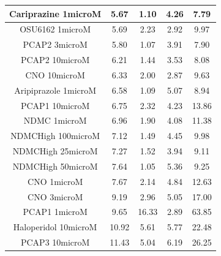 \documentclass[a4paper,12pt]{article}
\begin{document}
\begin{table}[h!]
\begin{tabular}{|c|c|c|c|c|}
Cariprazine 1microM   & 5.67  & 1.10   & 4.26 & 7.79  \\ \hline
OSU6162 1microM       & 5.69  & 2.23  & 2.92 & 9.97  \\ \hline
PCAP2 3microM         & 5.80   & 1.07  & 3.91 & 7.90   \\ \hline
PCAP2 10microM        & 6.21  & 1.44  & 3.53 & 8.08  \\ \hline
CNO 10microM          & 6.33  & 2.00     & 2.87 & 9.63  \\ \hline
Aripiprazole 1microM  & 6.58  & 1.09  & 5.07 & 8.94  \\ \hline
PCAP1 10microM        & 6.75  & 2.32  & 4.23 & 13.86 \\ \hline
NDMC 1microM          & 6.96  & 1.90   & 4.08 & 11.38 \\ \hline
NDMCHigh 100microM    & 7.12  & 1.49  & 4.45 & 9.98  \\ \hline
NDMCHigh 25microM     & 7.27  & 1.52  & 3.94 & 9.11  \\ \hline
NDMCHigh 50microM     & 7.64  & 1.05  & 5.36 & 9.25  \\ \hline
CNO 1microM           & 7.67  & 2.14  & 4.84 & 12.63 \\ \hline
CNO 3microM           & 9.19  & 2.96  & 5.05 & 17.00    \\ \hline
PCAP1 1microM         & 9.65  & 16.33 & 2.89 & 63.85 \\ \hline
Haloperidol 10microM  & 10.92 & 5.61  & 5.77 & 22.48 \\ \hline
PCAP3 10microM      & 11.43 & 5.04  & 6.19 & 26.25 \\ \hline
\end{tabular}
\end{table}
\newpage
\end{document}
